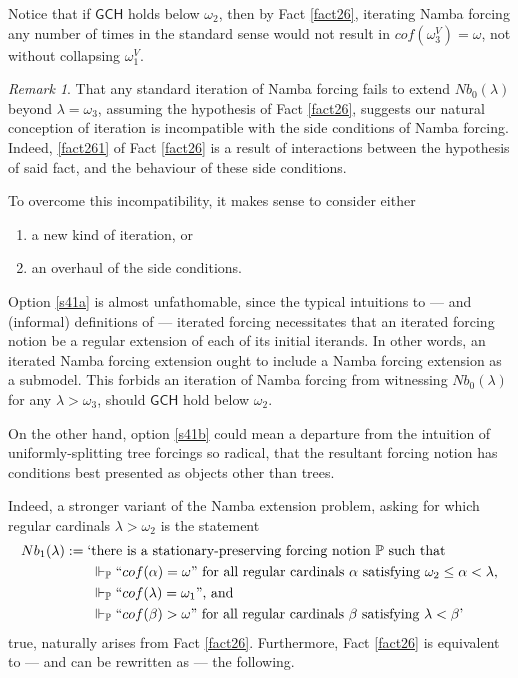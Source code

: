 \documentclass[12pt, twoside]{memoir}
\numberwithin{equation}{section}
\theoremstyle{definition}
\theoremstyle{remark}
\newtheorem{rem}[thm]{Remark}
\theoremstyle{definition}
\theoremstyle{definition}
\theoremstyle{definition}
\theoremstyle{remark}
\begin{document}
Notice that if $\mathsf{GCH}$ holds below $\omega_2$, then by Fact \ref{fact26}, iterating Namba forcing any number of times in the standard sense would not result in $cof(\omega_3^V) = \omega$, not without collapsing $\omega_1^V$.

\begin{rem}\label{rem47}
That any standard iteration of Namba forcing fails to extend $Nb_0(\lambda)$ beyond $\lambda = \omega_3$, assuming the hypothesis of Fact \ref{fact26}, suggests our natural conception of iteration is incompatible with the side conditions of Namba forcing. Indeed, \ref{fact261} of Fact \ref{fact26} is a result of interactions between the hypothesis of said fact, and the behaviour of these side conditions. 

To overcome this incompatibility, it makes sense to consider either
\begin{enumerate}[label=(\alph*)]
    \item\label{s41a} a new kind of iteration, or 
    \item\label{s41b} an overhaul of the side conditions.
\end{enumerate} 

Option \ref{s41a} is almost unfathomable, since the typical intuitions to --- and (informal) definitions of --- iterated forcing necessitates that an iterated forcing notion be a regular extension of each of its initial iterands. In other words, an iterated Namba forcing extension ought to include a Namba forcing extension as a submodel. This forbids an iteration of Namba forcing from witnessing $Nb_0(\lambda)$ for any $\lambda > \omega_3$, should $\mathsf{GCH}$ hold below $\omega_2$. 

On the other hand, option \ref{s41b} could mean a departure from the intuition of uniformly-splitting tree forcings so radical, that the resultant forcing notion has conditions best presented as objects other than trees.
\end{rem}

Indeed, a stronger variant of the Namba extension problem, asking for which regular cardinals $\lambda > \omega_2$ is the statement
\begin{align*}
    Nb_1(\lambda) := \text{`} & \text{there is a stationary-preserving forcing notion } \mathbb{P} \text{ such that} \\ 
    & \Vdash_{\mathbb{P}} ``cof(\alpha) = \omega" \text{ for all regular cardinals } \alpha \text{ satisfying } \omega_2 \leq \alpha < \lambda \text{,} \\
    & \Vdash_{\mathbb{P}} ``cof(\lambda) = \omega_1" \text{, and} \\
    & \Vdash_{\mathbb{P}} ``cof(\beta) > \omega" \text{ for all regular cardinals } \beta \text{ satisfying } \lambda < \beta \text{'}
\end{align*}
true, naturally arises from Fact \ref{fact26}. Furthermore, Fact \ref{fact26} is equivalent to --- and can be rewritten as --- the following.
\end{document}
